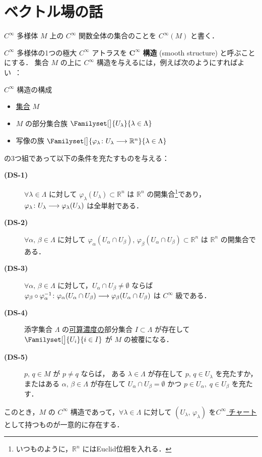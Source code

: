 \documentclass[TQFT_main]{subfiles}
\begin{document}
\chapter{ベクトル場の話}

$C^\infty$ 多様体 $M$ 上の $C^\infty$ 関数全体の集合のことを $C^\infty (M)$ と書く．

$C^\infty$ 多様体の1つの極大 $C^\infty$ アトラスを $\bm{C^\infty}$ \textbf{構造} (smooth structure) と呼ぶことにする．
集合 $M$ の上に $C^\infty$ 構造を与えるには，例えば次のようにすればよい~\cite[p.21, Lemma 1.35]{Lee2012smooth}：

\begin{mylem}[label=lem:cinfty-chart]{$C^\infty$ 構造の構成}
	\begin{itemize}
		\item \underline{集合} $M$
		\item $M$ の部分集合族 $\Familyset[\big]{U_\lambda}{\lambda \in \Lambda}$
		\item 写像の族 $\Familyset[\big]{\varphi_\lambda \colon U_\lambda \lto \mathbb{R}^n}{\lambda \in \Lambda}$
	\end{itemize}
	の3つ組であって以下の条件を充たすものを与える：
	\begin{description}
		\item[\textbf{(DS-1)}]  $\forall \lambda \in \Lambda$ に対して 
		$\varphi_\lambda (U_\lambda) \subset \mathbb{R}^n$ は $\mathbb{R}^n$ の開集合\footnote{いつものように，$\mathbb{R}^n$ にはEuclid位相を入れる．}であり，
		$\varphi_\lambda \colon U_\lambda \longrightarrow \varphi_\lambda (U_\lambda)$
		は全単射である．
		\item[\textbf{(DS-2)}]  $\forall \alpha,\, \beta \in \Lambda$ に対して $\varphi_\alpha (U_\alpha \cap U_\beta),\, \varphi_\beta (U_\alpha \cap U_\beta) \subset \mathbb{R}^n$ は $\mathbb{R}^n$ の開集合である．
		\item[\textbf{(DS-3)}]  $\forall \alpha,\, \beta \in \Lambda$ に対して，$U_\alpha \cap U_\beta \neq \emptyset$ ならば $\varphi_\beta \circ \varphi_\alpha^{-1} \colon \varphi_\alpha (U_\alpha \cap U_\beta) \longrightarrow \varphi_\beta (U_\alpha \cap U_\beta)$ は $C^\infty$ 級である．
		\item[\textbf{(DS-4)}]  添字集合 $\Lambda$ の\underline{可算濃度の}部分集合 $I \subset \Lambda$ が存在して
		$\Familyset[\big]{U_i}{i \in I}$ が $M$ の被覆になる．
		\item[\textbf{(DS-5)}]  $p,\, q \in M$ が $p \neq q$ ならば，
		ある $\lambda \in \Lambda$ が存在して $p,\, q \in U_\lambda$ を充たすか，
		またはある $\alpha,\, \beta \in \Lambda$ が存在して $U_\alpha \cap U_\beta = \emptyset$ かつ $p \in U_\alpha,\; q \in U_\beta$ を充たす．
	\end{description}
	このとき，$M$ の $C^\infty$ 構造であって，$\forall \lambda \in \Lambda$ に対して $(U_\lambda,\, \varphi_\lambda)$ を\hyperref[diffmani]{$C^\infty$ チャート}として持つものが一意的に存在する．
\end{mylem}
\end{document}
